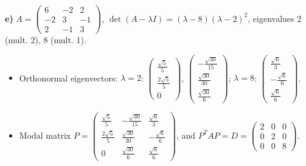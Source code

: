 \noindent\textbf{e)} $A=\begin{pmatrix}6 & -2 & 2 \\ -2 & 3 & -1 \\ 2 & -1 & 3\end{pmatrix}$, $\det(A-\lambda I)=\left(\lambda - 8\right) \left(\lambda - 2\right)^{2}$, eigenvalues $2$ (mult. 2), $8$ (mult. 1).
\begin{itemize}\item Orthonormal eigenvectors: $\lambda=2$: $\begin{pmatrix}\frac{\sqrt{5}}{5} \\ \frac{2 \sqrt{5}}{5} \\ 0\end{pmatrix}$, $\begin{pmatrix}- \frac{\sqrt{30}}{15} \\ \frac{\sqrt{30}}{30} \\ \frac{\sqrt{30}}{6}\end{pmatrix}$; $\lambda=8$: $\begin{pmatrix}\frac{\sqrt{6}}{3} \\ - \frac{\sqrt{6}}{6} \\ \frac{\sqrt{6}}{6}\end{pmatrix}$.
\item Modal matrix $P=\begin{pmatrix}\frac{\sqrt{5}}{5} & - \frac{\sqrt{30}}{15} & \frac{\sqrt{6}}{3} \\ \frac{2 \sqrt{5}}{5} & \frac{\sqrt{30}}{30} & - \frac{\sqrt{6}}{6} \\ 0 & \frac{\sqrt{30}}{6} & \frac{\sqrt{6}}{6}\end{pmatrix}$, and $P^TAP=D=\begin{pmatrix}2 & 0 & 0 \\ 0 & 2 & 0 \\ 0 & 0 & 8\end{pmatrix}$.\end{itemize}

